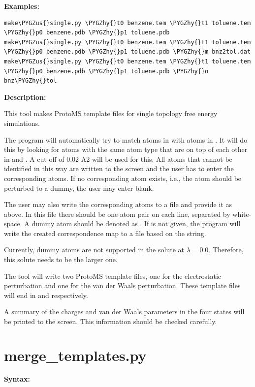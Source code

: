 \documentclass[letterpaper,10pt,english]{sphinxmanual}
\def\PYGZus{\char`\_}
\def\PYGZhy{\char`\-}
\begin{document}
\textbf{Examples:}

\begin{Verbatim}[frame=single,commandchars=\\\{\}]
make\PYGZus{}single.py \PYGZhy{}t0 benzene.tem \PYGZhy{}t1 toluene.tem \PYGZhy{}p0 benzene.pdb \PYGZhy{}p1 toluene.pdb
make\PYGZus{}single.py \PYGZhy{}t0 benzene.tem \PYGZhy{}t1 toluene.tem \PYGZhy{}p0 benzene.pdb \PYGZhy{}p1 toluene.pdb \PYGZhy{}m bnz2tol.dat
make\PYGZus{}single.py \PYGZhy{}t0 benzene.tem \PYGZhy{}t1 toluene.tem \PYGZhy{}p0 benzene.pdb \PYGZhy{}p1 toluene.pdb \PYGZhy{}o bnz\PYGZhy{}tol
\end{Verbatim}

\textbf{Description:}

This tool makes ProtoMS template files for single topology free energy simulations.

The program will automatically try to match atoms in  with atoms in . It will do this by looking for atoms with the same atom type that are on top of each other in  and . A cut-off of 0.02 A2 will be used for this. All atoms that cannot be identified in this way are written to the screen and the user has to enter the corresponding atoms. If no corresponding atom exists, i.e., the atom should be perturbed to a dummy, the user may enter blank.

The user may also write the corresponding atoms to a file and provide it as  above. In this file there should be one atom pair on each line, separated by white-space. A dummy atom should be denoted as . If  is not given, the program will write the created correspondence map to a file based on the  string.

Currently, dummy atoms are not supported in the solute at \(\lambda=0.0\). Therefore, this solute needs to be the larger one.

The tool will write two ProtoMS template files, one for the electrostatic perturbation and one for the van der Waals perturbation. These template files will end in  and  respectively.

A summary of the charges and van der Waals parameters in the four states will be printed to the screen. This information should be checked carefully.


\section{merge\_templates.py}
\label{tools:merge-templates-py}
\textbf{Syntax:}
\end{document}
